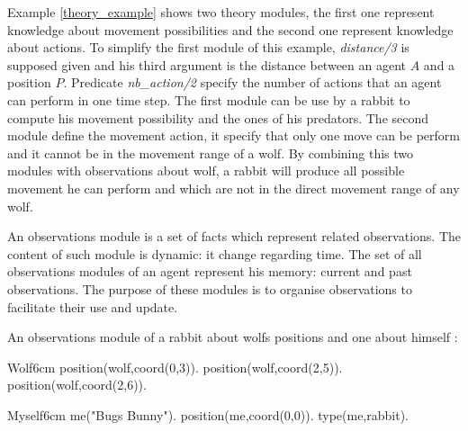 \documentclass{aamas2012}
\begin{document}
	Example \ref{theory_example} shows two theory modules, the first one represent knowledge about movement possibilities and 
	the second one represent knowledge about actions.
	To simplify the first module of this example, \textit{distance/3} is supposed given and 
	his third argument is the distance between an agent $A$ and a position $P$.
	Predicate \textit{nb\_action/2} specify the number of actions that an agent can perform in one time step.
	The first module can be use by a rabbit to compute his movement possibility and the ones of his predators.
	The second module define the movement action, it specify that only one move can be perform and it cannot be in the movement range of a wolf.
	By combining this two modules with observations about wolf, a rabbit will produce all possible movement he can perform and 
	which are not in the direct movement range of any wolf.

	\begin{definition}
		An observations module is a set of facts which represent related observations.
		The content of such module is dynamic: it change regarding time.
		The set of all observations modules of an agent represent his memory: current and past observations.
		The purpose of these modules is to organise observations to facilitate their use and update.
	\end{definition}
	
	\begin{example}
		An observations module of a rabbit about wolfs positions and one about himself :\newline
		\begin{module}{Wolf}{6cm}
			position(wolf,coord(0,3)).\newline
			position(wolf,coord(2,5)).\newline
			position(wolf,coord(2,6)).
		\end{module}
		
		\begin{module}{Myself}{6cm}
			me("Bugs Bunny").\newline
			position(me,coord(0,0)).\newline
			type(me,rabbit).
		\end{module}
	\end{example}
\end{document}
